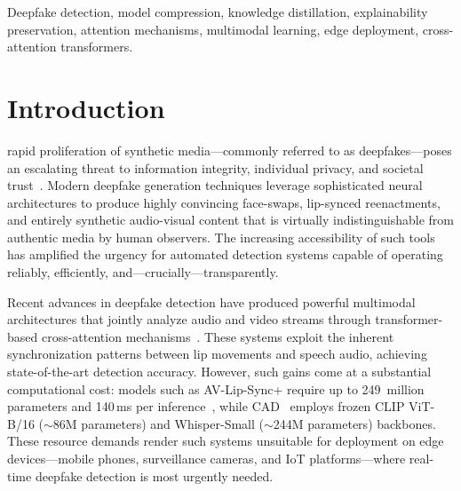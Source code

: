 \documentclass[lettersize,journal]{IEEEtran}
\begin{document}
\begin{IEEEkeywords}
Deepfake detection, model compression, knowledge distillation, explainability preservation, attention mechanisms, multimodal learning, edge deployment, cross-attention transformers.
\end{IEEEkeywords}


\section{Introduction}
\label{sec:intro}

 rapid proliferation of synthetic media---commonly referred to as deepfakes---poses an escalating threat to information integrity, individual privacy, and societal trust~\cite{wang2022m2tr, tariq2025dfp2e}. Modern deepfake generation techniques leverage sophisticated neural architectures to produce highly convincing face-swaps, lip-synced reenactments, and entirely synthetic audio-visual content that is virtually indistinguishable from authentic media by human observers. The increasing accessibility of such tools has amplified the urgency for automated detection systems capable of operating reliably, efficiently, and---crucially---transparently.

Recent advances in deepfake detection have produced powerful multimodal architectures that jointly analyze audio and video streams through transformer-based cross-attention mechanisms~\cite{du2025cad, shahzad2025avlipsync}. These systems exploit the inherent synchronization patterns between lip movements and speech audio, achieving state-of-the-art detection accuracy. However, such gains come at a substantial computational cost: models such as AV-Lip-Sync+ require up to 249~million parameters and 140\,ms per inference~\cite{shahzad2025avlipsync}, while CAD~\cite{du2025cad} employs frozen CLIP ViT-B/16 ($\sim$86M parameters) and Whisper-Small ($\sim$244M parameters) backbones. These resource demands render such systems unsuitable for deployment on edge devices---mobile phones, surveillance cameras, and IoT platforms---where real-time deepfake detection is most urgently needed.
\end{document}
